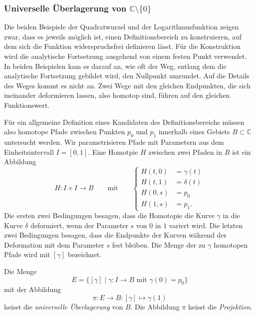 \subsubsection{Universelle Überlagerung von $\mathbb{C}\setminus\{0\}$}
Die beiden Beispiele der Quadratwurzel und der Logarithmusfunktion
zeigen zwar, dass es jeweils möglich ist, einen Definitionsbereich
zu konstruieren, auf dem sich die Funktion widerspruchsfrei definieren
lässt.
Für die Konstruktion wird die analytische Fortsetzung ausgehend von 
einem festen Punkt verwendet.
In beiden Beispielen kam es darauf an, wie oft der Weg, entlang dem
die analytische Fortsetzung gebildet wird, den Nullpunkt umrundet.
Auf die Details des Weges kommt es nicht an.
Zwei Wege mit den gleichen Endpunkten, die sich ineinander deformieren
lassen, also homotop sind,
%
führen auf den gleichen Funktionswert.

Für ein allgemeine Definition eines Kandidaten des Definitionsbereichs
müssen also homotope Pfade zwischen Punkten $p_0$ und $p_1$ innerhalb
eines Gebiets $B\subset\mathbb{C}$ untersucht werden.
Wir parametrisieren Pfade mit Parametern aus dem Einheitsintervall
$I=[0,1]$.
Eine Homotpie $H$ zwischen zwei Pfaden in $B$ ist ein Abbildung
\[
H\colon I\times I\to B
\qquad\text{mit}\qquad
\left\{
\begin{aligned}
H(t,0) &= \gamma(t) \\
H(t,1) &= \delta(t) \\
H(0,s) &= p_0 \\
H(1,s) &= p_1.
\end{aligned}
\right.
\]
Die ersten zwei Bedingungen besagen, dass die Homotopie die Kurve
$\gamma$ in die Kurve $\delta$ deformiert, wenn der Parameter $s$
von $0$ in $1$ variert wird.
Die letzten zwei Bedingungen besagen, dass die Endpunkte der Kurven
während der Deformation mit dem Parameter $s$ fest bleiben.
Die Menge der zu $\gamma$ homotopen Pfade wird mit $[\gamma]$
bezeichnet.

\begin{definition}
Die Menge
\[
E
=
\{
[\gamma]
\mid
\gamma\colon I\to B
\text{ mit }
\gamma(0)=p_0
\}
\]
mit der Abbildung
\[
\pi
\colon
E\to B
:
[\gamma] \mapsto \gamma(1)
\]
heisst die
\emph{universelle Überlagerung}
%
%
von $B$.
Die Abbildung $\pi$ heisst die \emph{Projektion}.
\end{definition}

